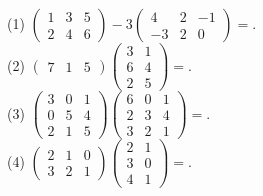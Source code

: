 (1) $\left(\begin{array}{ccc}1 &3 &5\\ 2& 4& 6\end{array}\right)-3\left(\begin{array}{ccc}4 & 2 & -1\\ -3 & 2 & 0\end{array}\right)=$\underline{}.\\ 
(2) $\left(\begin{array}{ccc}7&1&5\end{array}\right) \left(\begin{array}{cc}3&1\\6&4\\2&5\end{array}\right)=$\underline{}.\\ 
(3) $\left(\begin{array}{ccc}3&0&1\\0&5&4\\2&1&5\end{array}\right)\left(\begin{array}{ccc}6&0&1\\2&3&4\\3&2&1\end{array}\right)=$\underline{}.\\ 
(4) $\left(\begin{array}{ccc}2&1&0\\3&2&1\end{array}\right)\left(\begin{array}{cc}2&1\\3&0\\4&1\end{array}\right)=$\underline{}.\\ 
